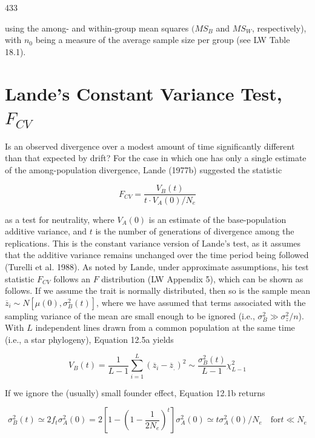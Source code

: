 \documentclass{article}
\begin{document}
433

using the among- and within-group mean squares  $ (MS_{B} $ and  $ MS_{W} $, respectively), with  $ n_{0} $ being a measure of the average sample size per group (see LW Table 18.1).

\section{Lande's Constant Variance Test,  $ F_{CV} $}
Is an observed divergence over a modest amount of time significantly different than that expected by drift? For the case in which one has only a single estimate of the among-population divergence, Lande (1977b) suggested the statistic

\begin{equation}
F_{CV}=\frac{V_{B}(t)}{t\cdot V_{A}(0)/N_{e}}
\tag{12.9a}
\label{eq:12_9a}
\end{equation}

as a test for neutrality, where  $ V_A(0) $ is an estimate of the base-population additive variance, and  $ t $ is the number of generations of divergence among the replications. This is the  $ \text{constant} $  $ \text{variance} $ version of  $ \text{Lande's} $ test, as it assumes that the additive variance remains unchanged over the time period being followed (Turelli et al. 1988). As noted by  $ \text{Lande} $, under approximate assumptions, his test statistic  $ F_{CV} $ follows an  $ F $ distribution (LW Appendix 5), which can be shown as follows. If we assume the trait is normally distributed, then so is the sample mean  $ \overline{z}_i \sim N[\mu(0), \sigma_B^2(t)] $, where we have assumed that terms associated with the sampling variance of the mean are small enough to be ignored (i.e.,  $ \sigma_B^2 \gg \sigma_z^2/n $). With  $ L $ independent lines drawn from a common population at the same time (i.e., a star phylogeny), Equation 12.5a yields

\begin{equation}
V_{B}(t)=\frac{1}{L-1}\sum_{i=1}^{L}(\overline{z}_{i}-\overline{z}_{.})^{2}\sim\frac{\sigma_{B}^{2}(t)}{L-1}\chi_{L-1}^{2}
\tag{12.9b}
\label{eq:12_9b}
\end{equation}

If we ignore the (usually) small founder effect, Equation 12.1b returns

\begin{equation}
\sigma_{B}^{2}(t)\simeq2f_{t}\sigma_{A}^{2}(0)=2\left[1-\left(1-\frac{1}{2N_{e}}\right)^{t}\right]\sigma_{A}^{2}(0)\simeq t\sigma_{A}^{2}(0)/N_{e}\quad\mathrm{f o r}t\ll N_{e}
\tag{12.9c}
\label{eq:12_9c}
\end{equation}
\end{document}
